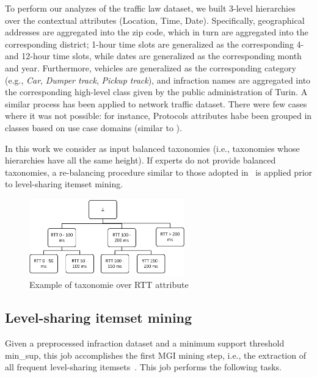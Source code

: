 To perform our analyzes of the traffic law dataset, we built 3-level hierarchies over the contextual attributes (Location, Time, Date). Specifically, geographical addresses 
are aggregated into the zip code, which in turn are aggregated into the corresponding district; 1-hour time slots are generalized as the corresponding 4- and 12-hour time slots, 
while dates are generalized as the corresponding month and year.
Furthermore, vehicles are generalized as the corresponding category (e.g., \textit{Car}, \textit{Dumper track}, \textit{Pickup track}), and
infraction names are aggregated into the corresponding high-level class given by the public administration of Turin.
A similar process has been applied to network traffic dataset. There were few cases where it was not possible: for instance, Protocols attributes habe been grouped in classes based on use case domains (similar to \cite{grimaudo2012hierarchical}).

In this work we consider as input balanced taxonomies (i.e., taxonomies whose hierarchies have all the same height). 
If experts do not provide balanced taxonomies, a re-balancing procedure similar to those adopted in~\cite{Flipping} is applied prior to level-sharing itemset mining. 


\begin{figure}
\centering
\includegraphics[width=0.60\textwidth]{chapters/mgi/tass_collage.jpg}
\caption{Example of taxonomie over RTT attribute}
\label{fig:tax_net}
\end{figure} 


\subsection{Level-sharing itemset mining}
\label{levelsharing}


Given a preprocessed infraction dataset and a minimum support threshold min\_sup, this job accomplishes the first MGI mining step, i.e., the extraction of all frequent level-sharing itemsets~\cite{Han1999}.  
This job performs the following tasks. 


